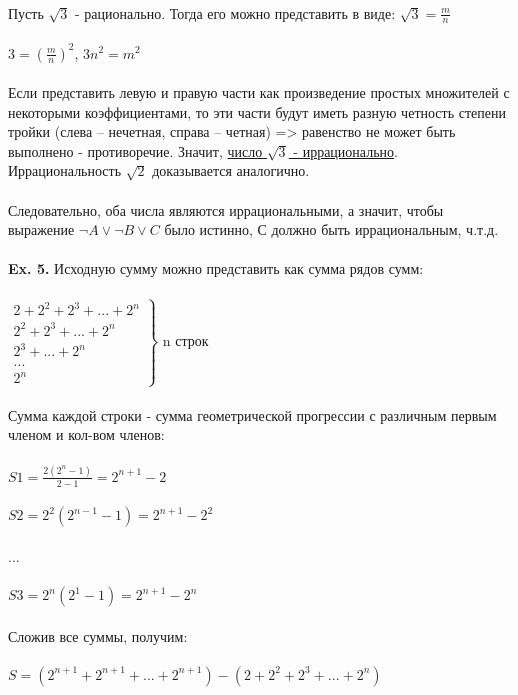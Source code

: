 \documentclass[a4paper,12pt]{article}
\begin{document}
\\
Пусть $ \sqrt3 $ - рационально. Тогда его можно представить в виде: $ \sqrt3 = \frac{m}{n}$
\\
\\
$ 3 = \left( \frac{m}{n} \right)^2 $, $ 3n^2 = m^2 $
\\
\\
Если представить левую и правую части как произведение простых множителей с некоторыми коэффициентами, то эти части будут иметь разную четность степени тройки (слева -- нечетная, справа -- четная) => равенство не может быть выполнено - противоречие. Значит, \underline{число $ \sqrt3 $ - иррационально}. Иррациональность $ \sqrt2 $ доказывается аналогично.
\\
\\
Следовательно, оба числа являются иррациональными, а значит, чтобы выражение $ \neg A \vee \neg B \vee C$ было истинно, С должно быть иррациональным, ч.т.д.
\\
\\
\textbf{Ex. 5.} Исходную сумму можно представить как сумма рядов сумм:
\\
\\
$
\left.
  \begin{array}{ccc}
2 + 2^2 + 2^3 + ... + 2^n 
\\
2^2 + 2^3 + ... + 2^n 
\\
2^3 + ... + 2^n 
\\
...
\\
2^n
\end{array}
\right\}
$
n строк
\\
\\
Сумма каждой строки - сумма геометрической прогрессии с различным первым членом и кол-вом членов:
\\
\\
$ S1 = \frac{2(2^n-1)}{2-1} = 2^{n+1} - 2 $
\\
\\
$ S2 = 2^2(2^{n-1}-1) = 2^{n+1} - 2^2 $
\\
\\
...
\\
\\
$ S3 = 2^n(2^1-1) = 2^{n+1} - 2^n$
\\
\\
Сложив все суммы, получим: 
\\
\\
$ S = (2^{n+1} + 2^{n+1} + ... + 2^{n+1}) - (2 + 2^2 + 2^3 + ... + 2^n) $
\\
\\
\end{document}
